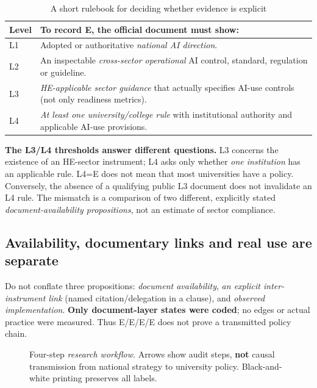 \documentclass[conference,letterpaper]{IEEEtran}
\newcommand{\stE}{\textsf{E}}
\begin{document}
\begin{table}[H]
\centering\caption{A short rulebook for deciding whether evidence is explicit}
\label{tab:gates}\small
\begin{tabularx}{\columnwidth}{@{}p{}X@{}}
\toprule
Level & To record \stE, the official document must show:\tabularnewline\midrule
L1 & Adopted or authoritative \emph{national AI direction}.\tabularnewline
L2 & An inspectable \emph{cross-sector operational} AI control, standard, regulation or guideline.\tabularnewline
L3 & \emph{HE-applicable sector guidance} that actually specifies AI-use controls (not only readiness metrics).\tabularnewline
L4 & \emph{At least one university/college rule} with institutional authority and applicable AI-use provisions.\tabularnewline
\bottomrule
\end{tabularx}
\end{table}

\textbf{The L3/L4 thresholds answer different questions.} L3 concerns the existence of an HE-sector instrument; L4 asks only whether \emph{one institution} has an applicable rule. L4=E does not mean that most universities have a policy. Conversely, the absence of a qualifying public L3 document does not invalidate an L4 rule. The mismatch is a comparison of two different, explicitly stated \emph{document-availability propositions}, not an estimate of sector compliance.

\subsection{Availability, documentary links and real use are separate}
Do not conflate three propositions: \emph{document availability}, \emph{an explicit inter-instrument link} (named citation/delegation in a clause), and \emph{observed implementation}. \textbf{Only document-layer states were coded}; no edges or actual practice were measured. Thus E/E/E/E does not prove a transmitted policy chain.

\begin{figure}[t]
\centering
{}
\caption{Four-step \emph{research workflow}. Arrows show audit steps, \textbf{not} causal transmission from national strategy to university policy. Black-and-white printing preserves all labels.}\label{fig:workflow}
\end{figure}
\end{document}
